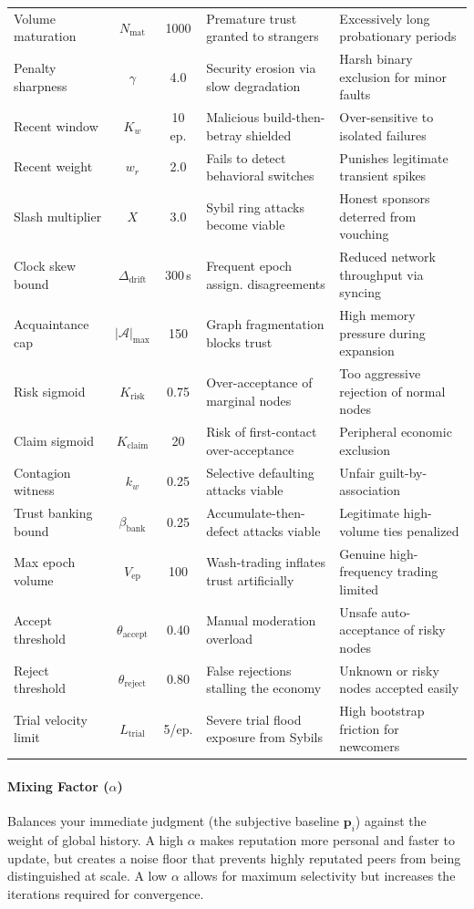 \documentclass[11pt]{article}
\begin{document}
\begin{center}
\begin{tabular}{|l|c|c|>{\raggedright\arraybackslash}p{3.1cm}|>{\raggedright\arraybackslash}p{3.1cm}|}
Volume maturation & $N_{\text{mat}}$ & 1000 & Premature trust granted to strangers & Excessively long probationary periods \\
Penalty sharpness & $\gamma$ & 4.0 & Security erosion via slow degradation & Harsh binary exclusion for minor faults \\
Recent window & $K_w$ & 10 ep. & Malicious build-then-betray shielded & Over-sensitive to isolated failures \\
Recent weight & $w_r$ & 2.0 & Fails to detect behavioral switches & Punishes legitimate transient spikes \\
Slash multiplier & $X$ & 3.0 & Sybil ring attacks become viable & Honest sponsors deterred from vouching \\
Clock skew bound & $\Delta_{\text{drift}}$ & 300\,s & Frequent epoch assign. disagreements & Reduced network throughput via syncing \\
Acquaintance cap & $|\mathcal{A}|_{\max}$ & 150 & Graph fragmentation blocks trust & High memory pressure during expansion \\
Risk sigmoid & $K_{\text{risk}}$ & 0.75 & Over-acceptance of marginal nodes & Too aggressive rejection of normal nodes \\
Claim sigmoid & $K_{\text{claim}}$ & 20 & Risk of first-contact over-acceptance & Peripheral economic exclusion \\
Contagion witness & $k_w$ & 0.25 & Selective defaulting attacks viable & Unfair guilt-by-association \\
Trust banking bound & $\beta_{\text{bank}}$ & 0.25 & Accumulate-then-defect attacks viable & Legitimate high-volume ties penalized \\
Max epoch volume & $V_{\text{ep}}$ & 100 & Wash-trading inflates trust artificially & Genuine high-frequency trading limited \\
Accept threshold & $\theta_{\text{accept}}$ & 0.40 & Manual moderation overload & Unsafe auto-acceptance of risky nodes \\
Reject threshold & $\theta_{\text{reject}}$ & 0.80 & False rejections stalling the economy & Unknown or risky nodes accepted easily \\
Trial velocity limit & $L_{\text{trial}}$ & 5/ep. & Severe trial flood exposure from Sybils & High bootstrap friction for newcomers \\
\hline
\end{tabular}
\end{center}

\paragraph{Mixing Factor ($\alpha$)}
Balances your immediate judgment (the subjective baseline $\mathbf{p}_i$) against the weight of global history. A high $\alpha$ makes reputation more personal and faster to update, but creates a noise floor that prevents highly reputated peers from being distinguished at scale. A low $\alpha$ allows for maximum selectivity but increases the iterations required for convergence.
\end{document}
